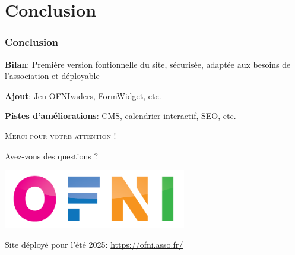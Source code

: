 \section{Conclusion}

\begin{frame}
    \frametitle{Conclusion}
    \centering
    \textbf{Bilan}: Première version fontionnelle du site, sécurisée, adaptée aux besoins de l’association et déployable
    \vspace{1cm}

    \textbf{Ajout}: Jeu OFNIvaders, FormWidget, etc.
    \vspace{1cm}

    \textbf{Pistes d'améliorations}: CMS, calendrier interactif, SEO, etc.
\end{frame}

\begin{frame}
    \scshape\huge\centering
    \vspace{1cm}
    Merci pour votre attention !\par
    \vspace{1cm}
    Avez-vous des questions ?\par
    \vspace{1cm}

    \includegraphics[width=8cm]{pictures/logo_OFNI.png}

    \normalsize
    Site déployé pour l'été 2025: \url{https://ofni.asso.fr/}

\end{frame}
